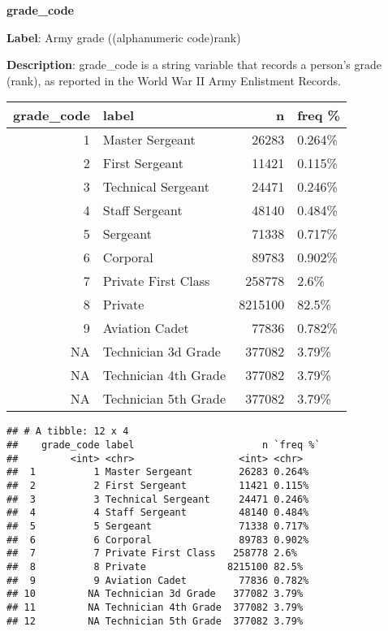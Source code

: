 \documentclass[
]{article}
\begin{document}
\newpage

\textbf{\huge grade\_code} \normalsize \vspace{12pt}

\textbf{Label}: Army grade ((alphanumeric code)rank)

\textbf{Description}: grade\_code is a string variable that records a
person's grade (rank), as reported in the World War II Army Enlistment
Records.

\begin{longtable}[]{@{}rlrl@{}}
\toprule()
grade\_code & label & n & freq \% \\
\midrule()
\endhead
1 & Master Sergeant & 26283 & 0.264\% \\
2 & First Sergeant & 11421 & 0.115\% \\
3 & Technical Sergeant & 24471 & 0.246\% \\
4 & Staff Sergeant & 48140 & 0.484\% \\
5 & Sergeant & 71338 & 0.717\% \\
6 & Corporal & 89783 & 0.902\% \\
7 & Private First Class & 258778 & 2.6\% \\
8 & Private & 8215100 & 82.5\% \\
9 & Aviation Cadet & 77836 & 0.782\% \\
NA & Technician 3d Grade & 377082 & 3.79\% \\
NA & Technician 4th Grade & 377082 & 3.79\% \\
NA & Technician 5th Grade & 377082 & 3.79\% \\
\bottomrule()
\end{longtable}

\vspace{30pt}

\begin{verbatim}
## # A tibble: 12 x 4
##    grade_code label                      n `freq %`
##         <int> <chr>                  <int> <chr>   
##  1          1 Master Sergeant        26283 0.264%  
##  2          2 First Sergeant         11421 0.115%  
##  3          3 Technical Sergeant     24471 0.246%  
##  4          4 Staff Sergeant         48140 0.484%  
##  5          5 Sergeant               71338 0.717%  
##  6          6 Corporal               89783 0.902%  
##  7          7 Private First Class   258778 2.6%    
##  8          8 Private              8215100 82.5%   
##  9          9 Aviation Cadet         77836 0.782%  
## 10         NA Technician 3d Grade   377082 3.79%   
## 11         NA Technician 4th Grade  377082 3.79%   
## 12         NA Technician 5th Grade  377082 3.79%
\end{verbatim}
\end{document}
